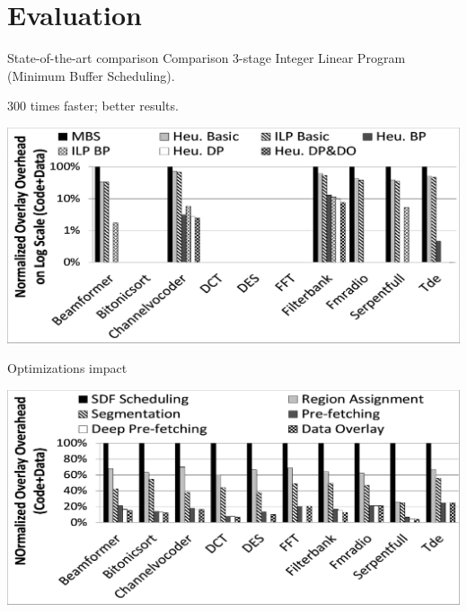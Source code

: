 \documentclass{beamer}
\begin{document}
\section{Evaluation}

\begin{frame}{State-of-the-art comparison}
  Comparison 3-stage Integer Linear Program (Minimum Buffer Scheduling).

  300 times faster; better results.
  \begin{center}
    \hspace*{-0.05\textwidth}
    \includegraphics[width=1.1\textwidth]{fig10}
  \end{center}
\end{frame}

\begin{frame}{Optimizations impact}
  \begin{center}
    \hspace*{-0.05\textwidth}
    \includegraphics[width=1.1\textwidth]{fig11}
  \end{center}
\end{frame}
\end{document}
